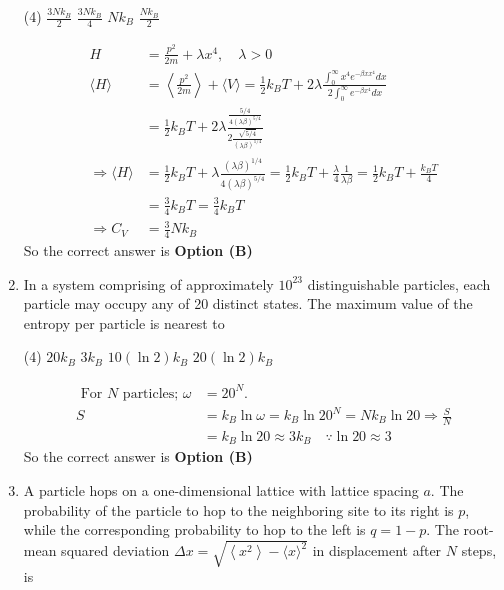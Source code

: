 \begin{enumerate}
\begin{tasks}(4)
\task[\textbf{A.}] $\frac{3 N k_{B}}{2}$
\task[\textbf{B.}] $\frac{3 N k_{B}}{4}$
\task[\textbf{C.}] $N k_{B}$
\task[\textbf{D.}] $\frac{N k_{B}}{2}$
\end{tasks}
\begin{answer}
\begin{align*}
H&=\frac{p^{2}}{2 m}+\lambda x^{4}, \quad \lambda>0\\
\langle H\rangle&=\left\langle\frac{p^{2}}{2 m}\right\rangle+\langle V\rangle=\frac{1}{2} k_{B} T+2 \lambda \frac{\int_{0}^{\infty} x^{4} e^{-\beta x x^{4}} d x}{2 \int_{0}^{\infty} e^{-\beta x^{4}} d x}\\&=\frac{1}{2} k_{B} T+2 \lambda \frac{\frac{5 / 4}{4(\lambda \beta)^{5 / 4}}}{2 \frac{\sqrt{5 / 4}}{(\lambda \beta)^{1 / 4}}}\\
\Rightarrow\langle H\rangle&=\frac{1}{2} k_{B} T+\lambda \frac{(\lambda \beta)^{1 / 4}}{4(\lambda \beta)^{5 / 4}}=\frac{1}{2} k_{B} T+\frac{\lambda}{4} \frac{1}{\lambda \beta}=\frac{1}{2} k_{B} T+\frac{k_{B} T}{4}\\&=\frac{3}{4} k_{B} T=\frac{3}{4} k_{B} T\\
\Rightarrow C_{V}&=\frac{3}{4} N k_{B}
\end{align*}
So the correct answer is \textbf{Option (B)}
\end{answer}
	\item In a system comprising of approximately $10^{23}$ distinguishable particles, each particle may occupy any of 20 distinct states. The maximum value of the entropy per particle is nearest to
\begin{tasks}(4)
\task[\textbf{A.}] $20 k_{B}$
\task[\textbf{B.}]  $3 k_{B}$
\task[\textbf{C.}] $10(\ln 2) k_{B}$
\task[\textbf{D.}] $20(\ln 2) k_{B}$
\end{tasks}
\begin{answer}
\begin{align*}
\text{	For $N$ particles; }\omega&=20^{N} .\\
S&=k_{B} \ln \omega=k_{B} \ln 20^{N}=N k_{B} \ln 20 \Rightarrow \frac{S}{N}\\&=k_{B} \ln 20 \approx 3 k_{B} \quad \because \ln 20 \approx 3
\end{align*}
So the correct answer is \textbf{Option (B)}
\end{answer}
	\item A particle hops on a one-dimensional lattice with lattice spacing $a$. The probability of the particle to hop to the neighboring site to its right is $p$, while the corresponding probability to hop to the left is $q=1-p$. The root-mean squared deviation $\Delta x=\sqrt{\left\langle x^{2}\right\rangle-\langle x\rangle^{2}}$ in displacement after $N$ steps, is

\end{enumerate}
